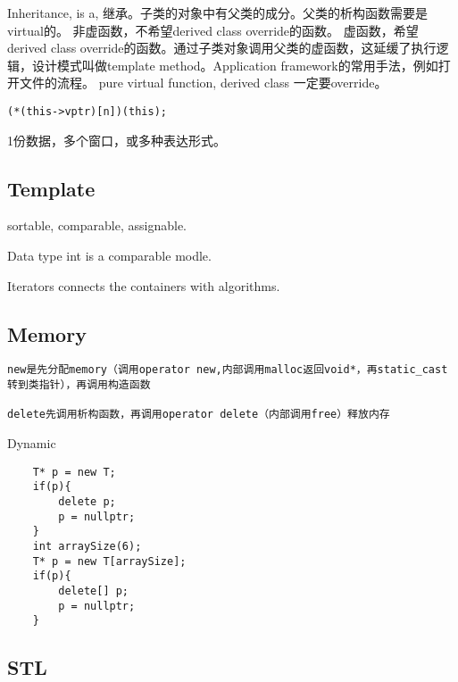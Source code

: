 \documentclass[UTF8]{../computerUniverse}
\begin{document}
Inheritance, is a, 继承。子类的对象中有父类的成分。父类的析构函数需要是virtual的。
非虚函数，不希望derived class override的函数。
虚函数，希望derived class override的函数。通过子类对象调用父类的虚函数，这延缓了执行逻辑，设计模式叫做template method。Application framework的常用手法，例如打开文件的流程。
pure virtual function, derived class 一定要override。
\begin{lstlisting}
(*(this->vptr)[n])(this);

\end{lstlisting}


1份数据，多个窗口，或多种表达形式。






\subsection{Template}
sortable, comparable, assignable.

Data type int is a comparable modle.

Iterators connects the containers with algorithms.






\subsection{Memory}

\begin{lstlisting}
new是先分配memory（调用operator new,内部调用malloc返回void*，再static_cast转到类指针），再调用构造函数

delete先调用析构函数，再调用operator delete（内部调用free）释放内存
\end{lstlisting}

Dynamic
\begin{lstlisting}
    T* p = new T;
    if(p){
        delete p;
        p = nullptr;
    }
    int arraySize(6);
    T* p = new T[arraySize];
    if(p){
        delete[] p;
        p = nullptr;
    }
\end{lstlisting}



\subsection{STL}
\end{document}
